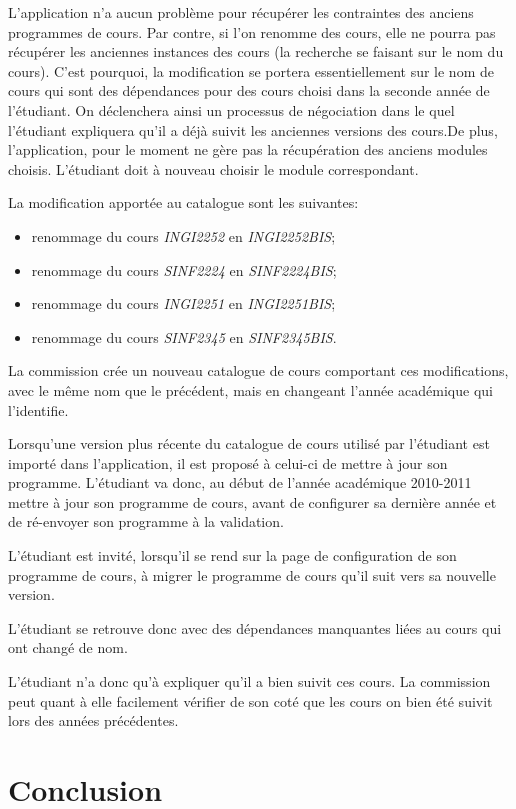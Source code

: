 L'application n'a aucun problème pour récupérer les contraintes des anciens programmes de cours. Par contre, si l'on renomme des cours, elle ne pourra pas récupérer les anciennes instances des cours (la recherche se faisant sur le nom du cours). C'est pourquoi, la modification se portera essentiellement sur le nom de cours qui sont des dépendances pour des cours choisi dans la seconde année de l'étudiant. On déclenchera ainsi un processus de négociation dans le quel l'étudiant expliquera qu'il a déjà suivit les anciennes versions des cours.De plus, l'application, pour le moment ne gère pas la récupération des anciens modules choisis. L'étudiant doit à nouveau choisir le module correspondant. 

La modification apportée au catalogue sont les suivantes:
\begin{itemize}
\item renommage du cours \textit{INGI2252} en \textit{INGI2252BIS};
\item renommage du cours \textit{SINF2224} en \textit{SINF2224BIS};
\item renommage du cours \textit{INGI2251} en \textit{INGI2251BIS};
\item renommage du cours \textit{SINF2345} en \textit{SINF2345BIS}.
\end{itemize}

La commission crée un nouveau catalogue de cours comportant ces modifications, avec le même nom que le précédent, mais en changeant l'année académique qui l'identifie. 

Lorsqu'une version plus récente du catalogue de cours utilisé par l'étudiant est importé dans l'application, il est proposé à celui-ci de mettre à jour son programme. L'étudiant va donc, au début de l'année académique 2010-2011 mettre à jour son programme de cours, avant de configurer sa dernière année et de ré-envoyer son programme à la validation.

L'étudiant est invité, lorsqu'il se rend sur la page de configuration de son programme de cours, à migrer le programme de cours qu'il suit vers sa nouvelle version.

L'étudiant se retrouve donc avec des dépendances manquantes liées au cours qui ont changé de nom. 

L'étudiant n'a donc qu'à expliquer qu'il a bien suivit ces cours. La commission peut quant à elle facilement vérifier de son coté que les cours on bien été suivit lors des années précédentes.


\section{Conclusion}

